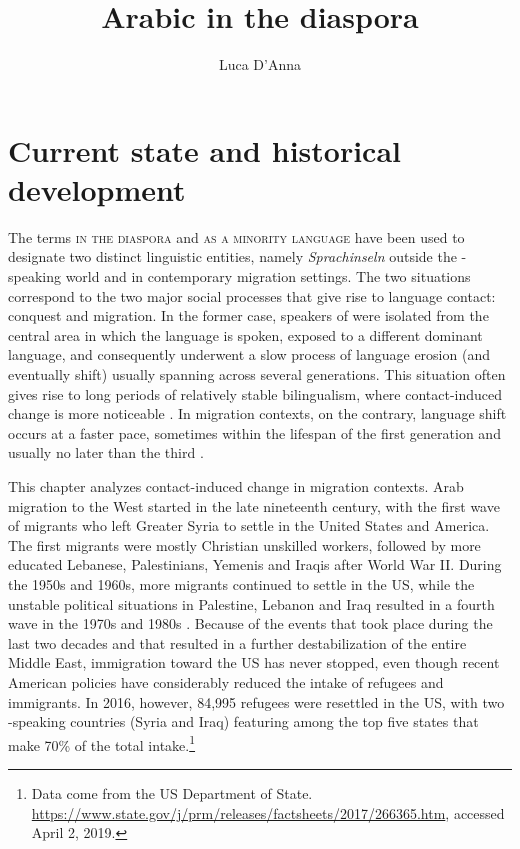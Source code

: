 \documentclass[output=paper]{langsci/langscibook}
\author{Luca D'Anna\affiliation{Università degli Studi di Napoli `L'Orientale'}}
\title{Arabic in the diaspora}
\begin{document}
\maketitle 

\section{Current state and historical development}

The terms \textsc{ in the diaspora} and \textsc{ as a minority language} have been used to designate two distinct linguistic entities, namely  \textit{Sprachinseln} outside the -speaking world and  in contemporary migration settings. The two situations correspond to the two major social processes that give rise to language contact: conquest and migration. In the former case, speakers of  were isolated from the central area in which the  language is spoken, exposed to a different dominant language, and consequently underwent a slow process of {language erosion} (and eventually shift) usually spanning across several generations. This situation often gives rise to long periods of relatively stable {bilingualism}, where contact-induced change is more noticeable \citep[641]{Sankoff2001}. In migration contexts, on the contrary, {language shift} occurs at a faster pace, sometimes within the lifespan of the first generation and usually no later than the third \citep[151]{Canagarajah2008}. 

This chapter analyzes contact-induced change in migration contexts. Arab migration to the West started in the late nineteenth century, with the first wave of migrants who left Greater Syria to settle in the United States and  America. The first migrants were mostly {Christian} unskilled workers, followed by more educated Lebanese, Palestinians, Yemenis and Iraqis after World War II. During the 1950s and 1960s, more migrants continued to settle in the US, while the unstable political situations in Palestine, Lebanon and Iraq resulted in a fourth wave in the 1970s and 1980s \citep[17--18]{Rouchdy_introduction_1992}. Because of the events that took place during the last two decades and that resulted in a further destabilization of the entire Middle East, immigration toward the US has never stopped, even though recent American policies have considerably reduced the intake of refugees and immigrants. In 2016, however, 84,995 refugees were resettled in the US, with two -speaking countries (Syria and Iraq) featuring among the top five states that make 70\% of the total intake.\footnote{Data come from the US Department of State. \url{https://www.state.gov/j/prm/releases/factsheets/2017/266365.htm}, accessed April 2, 2019.}
\end{document}
